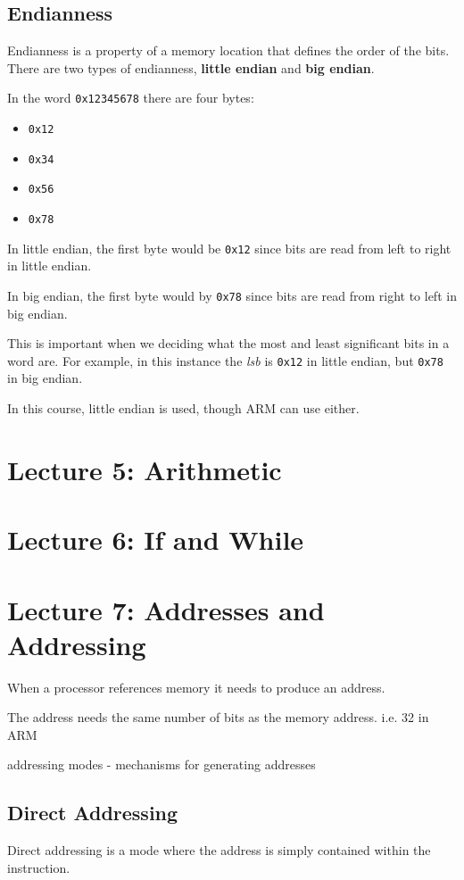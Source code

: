\documentclass{article}
\begin{document}
\subsection{Endianness}

Endianness is a property of a memory location that defines the order of the bits. There are two types of endianness, {\bf little endian} and {\bf big endian}.

In the word {\tt 0x12345678} there are four bytes:
\begin{itemize}
	\item {\tt 0x12}
	\item {\tt 0x34}
	\item {\tt 0x56}
	\item {\tt 0x78}
\end{itemize}

In little endian, the first byte would be {\tt 0x12} since bits are read from left to right in little endian.

In big endian, the first byte would by {\tt 0x78} since bits are read from right to left in big endian.

This is important when we deciding what the most and least significant bits in a word are. For example, in this instance the {\it lsb} is {\tt 0x12} in little endian, but {\tt 0x78} in big endian.

In this course, little endian is used, though ARM can use either.

\section{Lecture 5: Arithmetic}
\section{Lecture 6: If and While}

\section{Lecture 7: Addresses and Addressing}
When a processor references memory it needs to produce an address.

The address needs the same number of bits as the memory address. i.e. 32 in ARM

addressing modes - mechanisms for generating addresses

\subsection{Direct Addressing}
Direct addressing is a mode where the address is simply contained within the instruction.
\end{document}
